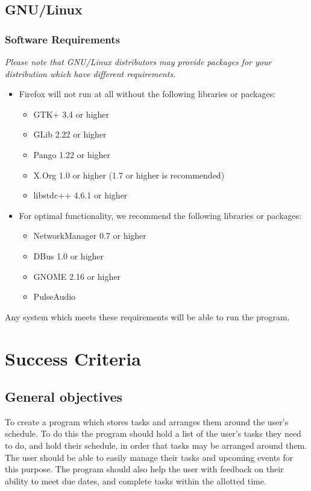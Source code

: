 \documentclass{article}
\begin{document}
\subsection*{GNU/Linux}\label{gnulinux}

\subsubsection*{Software Requirements}\label{software-requirements}

\emph{Please note that GNU/Linux distributors may provide packages for your
	distribution which have different requirements.}

\begin{itemize}
	\item Firefox will not run at all without the following libraries or packages:

	      \begin{itemize}
		      \item GTK+ 3.4 or higher
		      \item GLib 2.22 or higher
		      \item Pango 1.22 or higher
		      \item X.Org 1.0 or higher (1.7 or higher is recommended)
		      \item libstdc++ 4.6.1 or higher
	      \end{itemize}
	\item For optimal functionality, we recommend the following libraries or
	      packages:

	      \begin{itemize}
		      \item NetworkManager 0.7 or higher \index{\item}\index{\item}\item DBus 1.0 or
		            higher
		      \item GNOME 2.16 or higher
		      \item PulseAudio
	      \end{itemize}
\end{itemize}

Any system which meets these requirements will be able to run the program.

\section{Success Criteria}

\subsection{General objectives}
To create a program which stores tasks and arranges them around the user's schedule.
To do this the program should hold a list of the user's tasks they need to do,
and hold their schedule,
in order that tasks may be arranged around them.
The user should be able to easily manage their tasks and upcoming events for this purpose.
The program should also help the user with feedback on their ability to meet due dates,
and complete tasks within the allotted time.
\end{document}
